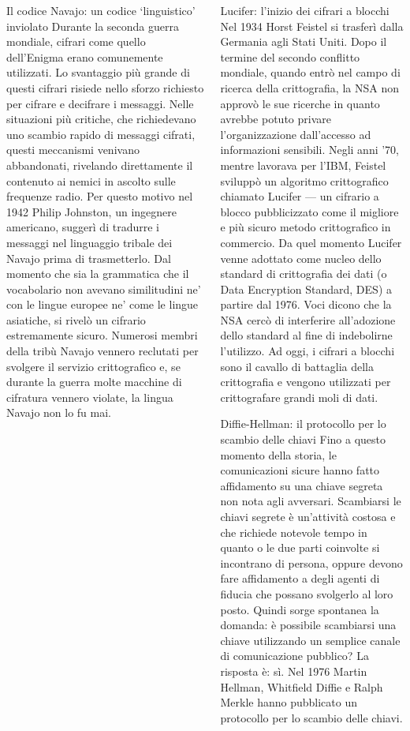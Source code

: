 \documentclass[final,hyperref={pdfpagelabels=false}]{beamer}
\begin{document}
\begin{frame}{}
\begin{columns}[t]
\begin{column}{.3\linewidth}
\begin{block}{Il codice Navajo: un codice `linguistico' inviolato}
          Durante la seconda guerra mondiale, cifrari come quello dell'Enigma erano comunemente utilizzati. Lo svantaggio più grande di questi cifrari risiede nello sforzo richiesto per cifrare e decifrare i messaggi. Nelle situazioni più critiche, che richiedevano uno scambio rapido di messaggi cifrati, questi meccanismi venivano abbandonati, rivelando direttamente il contenuto ai nemici in ascolto sulle frequenze radio. Per questo motivo nel 1942 Philip Johnston, un ingegnere americano, suggerì di tradurre i messaggi nel linguaggio tribale dei Navajo prima di trasmetterlo. Dal momento che sia la grammatica che il vocabolario non avevano similitudini ne' con le lingue europee ne' come le lingue asiatiche, si rivelò un cifrario estremamente sicuro. Numerosi membri della tribù Navajo vennero reclutati per svolgere il servizio crittografico e, se durante la guerra molte macchine di cifratura vennero violate, la lingua Navajo non lo fu mai.
        \end{block}

    \end{column}
    \begin{column}{.3\linewidth}
        \begin{block}{Lucifer: l'inizio dei cifrari a blocchi}
          Nel 1934 Horst Feistel si trasferì dalla Germania agli Stati Uniti. Dopo il termine del secondo conflitto mondiale, quando entrò nel campo di ricerca della crittografia, la NSA non approvò le sue ricerche in quanto avrebbe potuto privare l'organizzazione dall'accesso ad informazioni sensibili. Negli anni '70, mentre lavorava per l'IBM, Feistel sviluppò un algoritmo crittografico chiamato Lucifer --- un cifrario a blocco pubblicizzato come il migliore e più sicuro metodo crittografico in commercio. Da quel momento Lucifer venne adottato come nucleo dello standard di crittografia dei dati (o Data Encryption Standard, DES) a partire dal 1976. Voci dicono che la NSA cercò di interferire all'adozione dello standard al fine di indebolirne l'utilizzo. Ad oggi, i cifrari a blocchi sono il cavallo di battaglia della crittografia e vengono utilizzati per crittografare grandi moli di dati.
        \end{block}

        \begin{block}{Diffie-Hellman: il protocollo per lo scambio delle chiavi}
          Fino a questo momento della storia, le comunicazioni sicure hanno fatto affidamento su una chiave segreta non nota agli avversari. Scambiarsi le chiavi segrete è un'attività costosa e che richiede notevole tempo in quanto o le due parti coinvolte si incontrano di persona, oppure devono fare affidamento a degli agenti di fiducia che possano svolgerlo al loro posto. Quindi sorge spontanea la domanda: è possibile scambiarsi una chiave utilizzando un semplice canale di comunicazione pubblico? La risposta è: sì. Nel 1976 Martin Hellman, Whitfield Diffie e Ralph Merkle hanno pubblicato un protocollo per lo scambio delle chiavi.
        \end{block}


\end{column}
\end{columns}
\end{frame}
\end{document}
